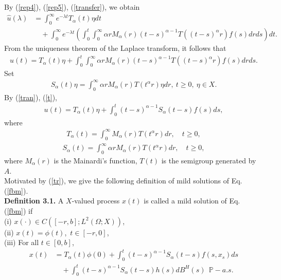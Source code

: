 \documentclass[12pt,a4paper,oneside,reqno,notitlepage]{amsart}
\theoremstyle{plain}
\numberwithin{equation}{section}
\begin{document}
By (\ref{rep4}), (\ref{rep5}), (\ref{transfer}), we obtain
\begin{align}\label{trans}
\widehat{u}(\lambda)&=\int_{0}^{\infty}e^{-\lambda t}T_{\alpha}(t)\eta dt\nonumber\\
&\quad+\int_{0}^{\infty}e^{-\lambda t}\left(\int_{0}^{t}\int_{0}^{\infty}\alpha rM_{\alpha}(r)(t-s)^{\alpha-1}T((t-s)^{\alpha}r)f(s)drds\right)dt.
\end{align}
From the uniqueness theorem of the Laplace transform, it follows that
\begin{align}\label{tran}
u(t)=T_{\alpha}(t)\eta+\int_{0}^{t}\int_{0}^{\infty}\alpha rM_{\alpha}(r)(t-s)^{\alpha-1}T((t-s)^{\alpha}r)f(s)drds.
\end{align}
Set
\begin{align}\label{t}
S_{\alpha}(t)\eta=\int_{0}^{\infty}\alpha rM_{\alpha}(r)T(t^{\alpha}r)\eta dr, \ t\geq 0, \ \eta\in X.
\end{align}
By (\ref{tran}), (\ref{t}),
\begin{align}\label{tr}
u(t)=T_{\alpha}(t)\eta+\int_{0}^{t}(t-s)^{\alpha-1}S_{\alpha}(t-s)f(s)ds,
\end{align}
where
\begin{align}\label{rep1}
T_{\alpha}(t)=\int_{0}^{\infty}M_{\alpha}(r)T(t^{\alpha}r)dr,\quad t\geq0,
\end{align}
\begin{align}\label{tra}
S_{\alpha}(t)=\int_{0}^{\infty}\alpha rM_{\alpha}(r)T(t^{\alpha}r)dr, \quad t\geq 0,
\end{align}
where $M_{\alpha}(r)$ is the Mainardi's function, $T(t)$ is the semigroup generated by $A$.\\


Motivated by (\ref{tr}), we give the following definition of mild solutions of Eq. (\ref{fbm}).\\
\textbf{Definition 3.1.} A $X$-valued process $x(t)$ is called a mild solution of Eq. (\ref{fbm}) if\\
(i) $x(\cdot)\in C([-r,b];L^{2}(\Omega;X))$,\\
(ii) $x(t)=\phi(t)$,\ $t\in [-r,0]$,\\
(iii) For all $t\in[0,b]$,
\begin{align}\label{solution}
x(t)&=T_{\alpha}(t)\phi(0)+\int_{0}^{t}(t-s)^{\alpha-1}S_{\alpha}(t-s)f(s,x_{s})ds\nonumber\\
&\quad+\int_{0}^{t}(t-s)^{\alpha-1}S_{\alpha}(t-s)h(s)dB^{H}(s) \ \ \mathbb{P}-a.s.
\end{align}
\end{document}
